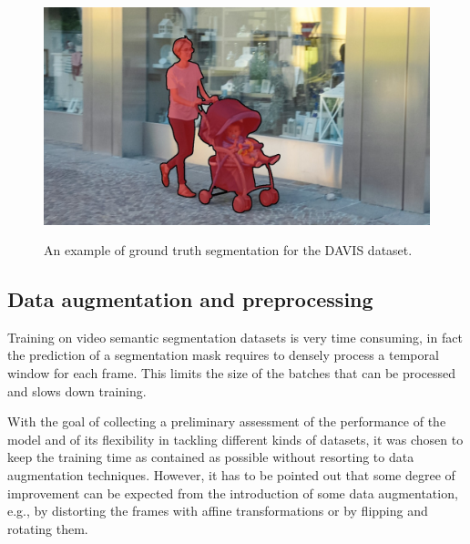 \begin{figure}[t]
    \includegraphics[width=0.3\columnwidth]{img/deconvLSTM/davis_gt9.jpg}\\
    \caption{An example of ground truth segmentation for the DAVIS dataset.}
    \label{fig:deconvlstm_davis_gt}
\end{figure}




\subsection{Data augmentation and preprocessing}
Training on video semantic segmentation datasets is very time consuming, in
fact the prediction of a segmentation mask requires to densely process a
temporal window for each frame. This limits the size of the batches that can
be processed and slows down training.

With the goal of collecting a preliminary assessment of the performance of the
model and of its flexibility in tackling different kinds of datasets, it was
chosen to keep the training time as contained as possible without resorting to
data augmentation techniques. However, it has to be pointed out that some
degree of improvement can be expected from the introduction of some data
augmentation, e.g., by distorting the frames with affine transformations or by
flipping and rotating them.

